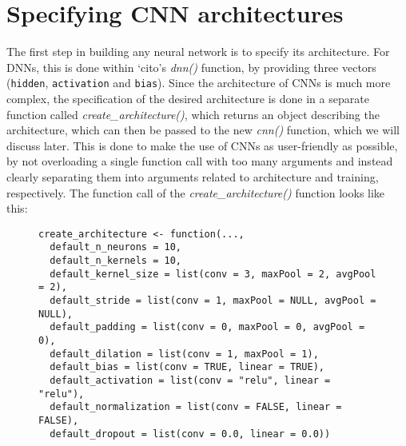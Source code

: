 \documentclass[12pt,twoside]{scrreport}
\newcommand{\pkg}[1]{`#1'}
\newcommand{\fn}[2][]{\textit{#2(}#1\textit{)}}
\newcommand{\val}[1]{\texttt{#1}}
\begin{document}
\section*{Specifying CNN architectures}

The first step in building any neural network is to specify its architecture. For DNNs, this is done within \pkg{cito}s \fn{dnn} function, by providing three vectors (\val{hidden}, \val{activation} and \val{bias}). Since the architecture of CNNs is much more complex, the specification of the desired architecture is done in a separate function called \fn{create\_architecture}, which returns an object describing the architecture, which can then be passed to the new \fn{cnn} function, which we will discuss later. This is done to make the use of CNNs as user-friendly as possible, by not overloading a single function call with too many arguments and instead clearly separating them into arguments related to architecture and training, respectively. The function call of the \fn{create\_architecture} function looks like this:

\begin{figure}[h]
	\centering
	\newsavebox{\lstbox} %
	\begin{lrbox}{\lstbox}
		\begin{lstlisting}
create_architecture <- function(...,
  default_n_neurons = 10,
  default_n_kernels = 10,
  default_kernel_size = list(conv = 3, maxPool = 2, avgPool = 2),
  default_stride = list(conv = 1, maxPool = NULL, avgPool = NULL),
  default_padding = list(conv = 0, maxPool = 0, avgPool = 0),
  default_dilation = list(conv = 1, maxPool = 1),
  default_bias = list(conv = TRUE, linear = TRUE),
  default_activation = list(conv = "relu", linear = "relu"),
  default_normalization = list(conv = FALSE, linear = FALSE),
  default_dropout = list(conv = 0.0, linear = 0.0))
		\end{lstlisting}
	\end{lrbox}
	\resizebox{\textwidth}{!}{\usebox{\lstbox}}
\end{figure}
\end{document}
